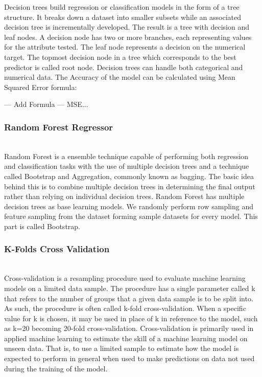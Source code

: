 \documentclass[conference]{IEEEtran}
\begin{document}
Decision trees build regression or classification models in the form of a tree structure.
It breaks down a dataset into smaller subsets while an associated decision tree is incrementally developed.
The result is a tree with decision and leaf nodes.
A decision node has two or more branches, each representing values for the attribute tested.
The leaf node represents a decision on the numerical target.
The topmost decision node in a tree which corresponds to the best predictor is called root node.
Decision trees can handle both categorical and numerical data.
The Accuracy of the model can be calculated using Mean Squared Error formula:

--- Add Formula --- MSE...

\subsubsection{Random Forest Regressor}\\

Random Forest is a ensemble technique capable of performing both regression and classification tasks with the use of multiple decision trees and a technique called Bootstrap and Aggregation, commonly known as bagging.
The basic idea behind this is to combine multiple decision trees in determining the final output rather than relying on individual decision trees.
Random Forest has multiple decision trees as base learning models.
We randomly perform row sampling and feature sampling from the dataset forming sample datasets for every model.
This part is called Bootstrap.

\subsubsection{K-Folds Cross Validation}\\

Cross-validation is a resampling procedure used to evaluate machine learning models on a limited data sample.
The procedure has a single parameter called k that refers to the number of groups that a given data sample is to be split into. As such, the procedure is often called k-fold cross-validation.
When a specific value for k is chosen, it may be used in place of k in reference to the model, such as k=20 becoming 20-fold cross-validation.
Cross-validation is primarily used in applied machine learning to estimate the skill of a machine learning model on unseen data.
That is, to use a limited sample to estimate how the model is expected to perform in general when used to make predictions on data not used during the training of the model.
\end{document}
